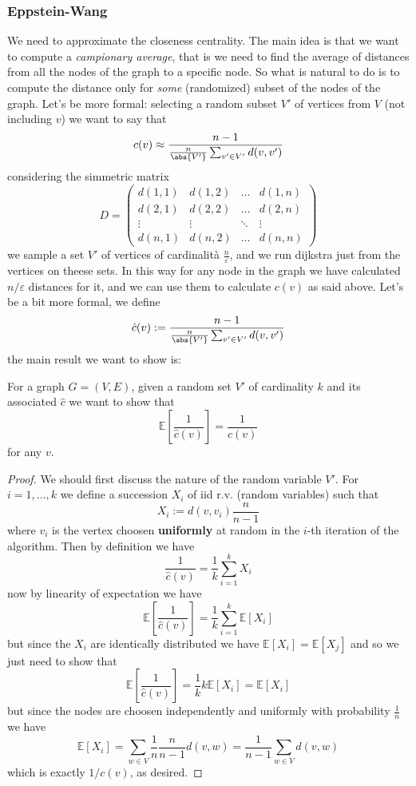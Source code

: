 \documentclass[11pt]{scrartcl}
\begin{document}
	\subsubsection{Eppstein-Wang}
	
	We need to approximate the closeness centrality. The main idea is that we want to compute a \textit{campionary average}, that is we need to find the average of distances from all the nodes of the graph to a specific node. So what is natural to do is to compute the distance only for \textit{some} (randomized) subset of the nodes of the graph. Let's be more formal: selecting a random subset $V'$ of vertices from $V$ (not including $v$) we want to say that
	$$c(v)\approx\frac{n-1}{\frac{n}{\abs{V'}}\sum_{v'\in V'}d(v,v')}$$
	considering the simmetric matrix 
	$$D=
	\begin{pmatrix}
		d(1,1) & d(1,2) & \dots & d(1,n) \\
		d(2,1) & d(2,2) & \dots & d(2,n) \\
		\vdots & \vdots & \ddots& \vdots \\
		d(n,1) & d(n,2) & \dots & d(n,n)
	\end{pmatrix}
	$$
	we sample a set $V'$ of vertices of cardinalità $\frac{n}{\varepsilon}$, and we run dijkstra just from the vertices on theese sets. In this way for any node in the graph we have calculated $n/\varepsilon$ distances for it, and we can use them to calculate $c(v)$ as said above. Let's be a bit more formal, we define
	$$\hat{c}(v):=\frac{n-1}{\frac{n}{\abs{V'}}\sum_{v'\in V'}d(v,v')}$$
	the main result we want to show is:
	\begin{proposition}
		For a graph $G=(V,E)$, given a random set $V'$ of cardinality $k$ and its associated $\hat{c}$ we want to show that
		$$\mathbb{E}\left[\frac{1}{\hat{c}(v)}\right]=\frac{1}{c(v)}$$
		for any $v$.
	\end{proposition}
	\begin{proof}
		We should first discuss the nature of the random variable $V'$. For $i=1,\dots,k$ we define a succession $X_i$ of iid r.v. (random variables) such that 
		$$X_i:=d(v,v_i)\frac{n}{n-1}$$
		where $v_i$ is the vertex choosen \textbf{uniformly} at random in the $i$-th iteration of the algorithm. Then by definition we have
		$$\frac{1}{\hat{c}(v)}=\frac{1}{k}\sum_{i=1}^{k}X_i$$
		now by linearity of expectation we have
		$$\mathbb{E}\left[\frac{1}{\hat{c}(v)}\right]=\frac{1}{k}\sum_{i=1}^{k}\mathbb{E}\left[X_i\right]$$
		but since the $X_i$ are identically distributed we have $\mathbb{E}[X_i]=\mathbb{E}[X_j]$ and so we just need to show that
		$$\mathbb{E}\left[\frac{1}{\hat{c}(v)}\right]=\frac{1}{k}k\mathbb{E}[X_i]=\mathbb{E}[X_i]$$
		but since the nodes are choosen independently and uniformly with probability $\frac{1}{n}$ we have
		$$\mathbb{E}\left[X_i\right]=\sum_{w\in V}\frac{1}{n}\frac{n}{n-1}d(v,w)=\frac{1}{n-1}\sum_{w\in V}d(v,w)$$
		which is exactly $1/c(v)$, as desired.
	\end{proof}
\end{document}

